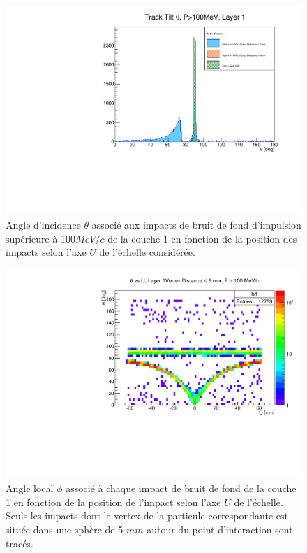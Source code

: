 \begin{appendices}
  \begin{figure}[!htb]
    \centering
    \includegraphics[scale=0.58]{./figures/Track_Tilts_Beamstrahlung/beamstrahlung_Theta/Track_Tilts_Theta_P_sup_100MeV_Layer1.pdf}
    \caption{Angle d'incidence $\theta$ associ\'e aux impacts de bruit de fond d'impulsion sup\'erieure \`a $100 MeV/c$ de la couche 1 en fonction de la position des impacts selon l'axe $U$ de l'\'echelle consid\'er\'ee.}
    \label{fig:theta_Layer1_pT_sup_100MeV}
  \end{figure}
  
  \begin{figure}[!htb]
    \centering
    \includegraphics[scale=0.58]{./figures/Track_Tilts_Beamstrahlung/beamstrahlung_Theta/Track_Tilts_Theta_vs_U_P_sup_100MeV_vertex_inf_5mm_Layer1.pdf}
    \caption{Angle local $\phi$ associ\'e \`a chaque impact de bruit de fond de la couche 1 en fonction de la position de l'impact selon l'axe $U$ de l'\'echelle. Seuls les impacts dont le vertex de la particule correspondante est situ\'ee dans une sph\`ere de 5 $mm$ autour du point d'interaction sont trac\'es.}
    \label{fig:theta_Layer1_vs_U_P_sup_100MeV_vertex_inf_5mm}
  \end{figure}
  

\end{appendices}

